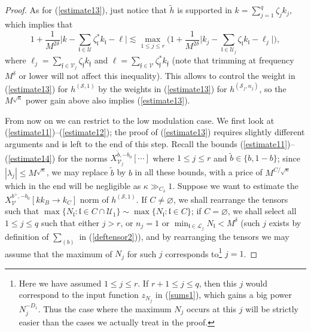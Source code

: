 \documentclass[11 pt,reqno]{amsart}
\theoremstyle{definition}
\theoremstyle{remark}
\numberwithin{equation}{section}
\newcommand{\Sc}{\mathcal{S}}
\newcommand{\Lc}{\mathcal{L}}
\newcommand{\Uc}{\mathcal{U}}
\newcommand{\Vc}{\mathcal{V}}
\newcommand{\ff}{\mathfrak{f}}
\newcommand{\lf}{\mathfrak{l}}
\begin{document}
{\begin{proof}
As for (\ref{estimate13}), just notice that $\widetilde{h}$ is supported in $k=\sum_{j=1}^q\zeta_jk_j$, which implies that
\begin{equation}\label{maxweight}1+\frac{1}{M^{2\delta}}\bigg|k-\sum_{\lf\in\Uc}\zeta_\lf^* k_\lf-\ell\bigg|\lesssim\max_{1\leq j\leq r}\bigg(1+\frac{1}{M^{2\delta}}\bigg|k_j-\sum_{\lf\in\Uc_j}\zeta_\lf k_\lf-\ell_j\bigg|\bigg),\end{equation} where $\ell_j=\sum_{\ff\in\Vc_j}\zeta_\ff k_\ff$ and $\ell=\sum_{\ff\in\Vc}\zeta_\ff^* k_\ff$ (note that trimming at frequency $M^\delta$ or lower will not affect this inequality). This allows to control the weight in (\ref{estimate13}) for $h^{(\Sc,1)}$ by the weights in (\ref{estimate13}) for $h^{(\Sc_j,n_j)}$, so the $M^{\sqrt{\kappa}}$ power gain above also implies (\ref{estimate13}).

From now on we can restrict to the low modulation case. We first look at (\ref{estimate11})--(\ref{estimate12}); the proof of (\ref{estimate13}) requires slightly different arguments and is left to the end of this step. Recall the bounds (\ref{estimate11})--(\ref{estimate14}) for the norms $X_{\Vc_j}^{\widetilde{b},-b_0}[\cdots]$ where $1\leq j\leq r$ and $\widetilde{b}\in\{b,1-b\}$; since $|\lambda_j|\leq M^{\sqrt{\kappa}}$, we may replace $\widetilde{b}$ by $b$ in all these bounds, with a price of $M^{C/\sqrt{\kappa}}$ which in the end will be negligible as $\kappa\gg_{C_\delta}1$. Suppose we want to estimate the $X_\Vc^{b^+,-b_0}[kk_B\to k_C]$ norm of $h^{(\Sc,1)}$. If $C\neq\varnothing$, we shall rearrange the tensors such that $\max\{N_\lf:\lf\in C\cap \Uc_1\}\sim\max\{N_\lf:\lf\in C\}$; if $C=\varnothing$, we shall select all $1\leq j\leq q$ such that either $j>r$, or $n_j=1$ or $\min_{\lf\in\Lc_j}N_\lf<M^\delta$ (such $j$ exists by definition of $\sum_{(b)}$ in (\ref{deftensor2})), and by rearranging the tensors we may assume that the maximum of $N_j$ for such $j$ corresponds to\footnote{Here we have assumed $1\leq j\leq r$. If $r+1\leq j\leq q$, then this $j$ would correspond to the input function $z_{N_j}$ in (\ref{sums1}), which gains a big power $N_j^{-D_1}$. Thus the case where the maximum $N_j$ occurs at this $j$ will be strictly easier than the cases we actually treat in the proof.} $j=1$.


\end{proof}}
\end{document}
